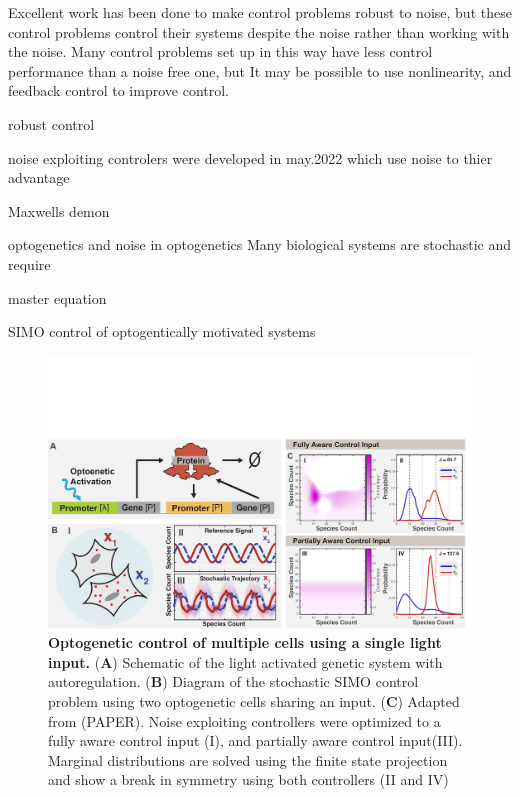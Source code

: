 \documentclass[12pt]{article}
\begin{document}
Excellent work has been done to make control problems robust to noise, but these control problems control their systems despite the noise rather than working with the noise.
Many control problems set up in this way have less control performance than a noise free one, but It may be possible to use nonlinearity, and feedback control to improve control.

robust control

noise exploiting controlers were developed in may.2022 which use noise to thier advantage 

Maxwells demon

optogenetics and noise in optogenetics
Many biological systems are stochastic and require 

master equation

SIMO control of optogentically motivated systems


\begin{figure}
\begin{center}
\includegraphics[width=\columnwidth]{CartoonAndController.pdf}
\caption{{\bf Optogenetic control of multiple cells using a single light input.}
({\bf A}) Schematic of the light activated genetic system with autoregulation.
({\bf B}) Diagram of the stochastic SIMO control problem using two optogenetic cells sharing an input.
({\bf C}) Adapted from (PAPER). Noise exploiting controllers were optimized to a fully aware control input (I), and partially aware control input(III). Marginal distributions are solved using the finite state projection and show a break in symmetry using both controllers (II and IV) }
\label{cartoons}
\end{center}
\vspace{-0.3in}
\end{figure}
\end{document}
